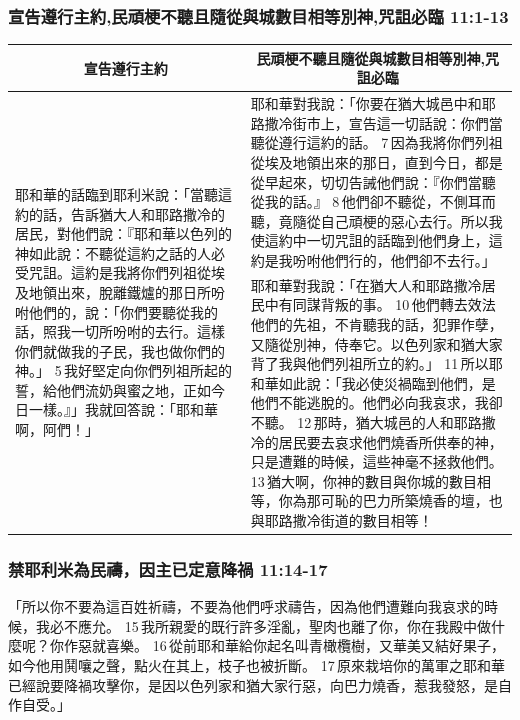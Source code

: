\subsubsection{宣告遵行主約,民頑梗不聽且隨從與城數目相等別神,咒詛必臨 11:1-13}
\begin{table}[H]
\centering
\begin{tabular}{p{5.75cm}|p{11.50cm}}\hline\hline
\multicolumn{1}{c|}{宣告遵行主約}&\multicolumn{1}{c}{民頑梗不聽且隨從與城數目相等別神,咒詛必臨}\\\hline
\multirow{2}{5.86cm}{耶和華的話臨到耶利米說：「當聽這約的話，告訴猶大人和耶路撒冷的居民，對他們說：『耶和華以色列的神如此說：不聽從這約之話的人必受咒詛。這約是我將你們列祖從埃及地領出來，脫離鐵爐的那日所吩咐他們的，說：「你們要聽從我的話，照我一切所吩咐的去行。這樣你們就做我的子民，我也做你們的神。」 5 我好堅定向你們列祖所起的誓，給他們流奶與蜜之地，正如今日一樣。』」我就回答說：「耶和華啊，阿們！」}
&耶和華對我說：「你要在猶大城邑中和耶路撒冷街市上，宣告這一切話說：你們當聽從遵行這約的話。 7 因為我將你們列祖從埃及地領出來的那日，直到今日，都是從早起來，切切告誡他們說：『你們當聽從我的話。』 8 他們卻不聽從，不側耳而聽，竟隨從自己頑梗的惡心去行。所以我使這約中一切咒詛的話臨到他們身上，這約是我吩咐他們行的，他們卻不去行。」\\\cline{2-2}
&耶和華對我說：「在猶大人和耶路撒冷居民中有同謀背叛的事。 10 他們轉去效法他們的先祖，不肯聽我的話，犯罪作孽，又隨從別神，侍奉它。以色列家和猶大家背了我與他們列祖所立的約。」 11 所以耶和華如此說：「我必使災禍臨到他們，是他們不能逃脫的。他們必向我哀求，我卻不聽。 12 那時，猶大城邑的人和耶路撒冷的居民要去哀求他們燒香所供奉的神，只是遭難的時候，這些神毫不拯救他們。 13 猶大啊，你神的數目與你城的數目相等，你為那可恥的巴力所築燒香的壇，也與耶路撒冷街道的數目相等！\\\hline
\end{tabular}
\end{table}

\subsubsection{禁耶利米為民禱，因主已定意降禍 11:14-17}
「所以你不要為這百姓祈禱，不要為他們呼求禱告，因為他們遭難向我哀求的時候，我必不應允。 15 我所親愛的既行許多淫亂，聖肉也離了你，你在我殿中做什麼呢？你作惡就喜樂。 16 從前耶和華給你起名叫青橄欖樹，又華美又結好果子，如今他用鬨嚷之聲，點火在其上，枝子也被折斷。 17 原來栽培你的萬軍之耶和華已經說要降禍攻擊你，是因以色列家和猶大家行惡，向巴力燒香，惹我發怒，是自作自受。」

